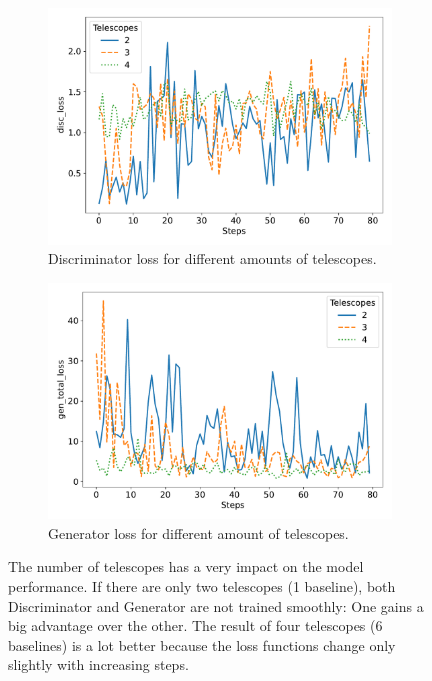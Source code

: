 \begin{figure}
	\centering
	\begin{subfigure}{0.5\linewidth}
		\centering
		\includegraphics[width=\textwidth]{fig/analysis/Plot_N_telescopes_disc_loss.pdf}
		\caption{Discriminator loss for different amounts of telescopes.}
		\label{fig:Plot_telescopes_discloss}
	\end{subfigure}\hfill
	\begin{subfigure}{0.5\linewidth}
		\centering
		\includegraphics[width=\textwidth]{fig/analysis/Plot_N_telescopes_gen_total_loss.pdf}
		\caption{Generator loss for different amount of telescopes.}
		\label{fig:Plot_telescopes_genloss}
	\end{subfigure}\hfill
	\caption{The number of telescopes has a very impact on the model performance. If there are only two telescopes (1 baseline), both Discriminator and Generator are not trained smoothly: One gains a big advantage over the other. The result of four telescopes (6 baselines) is a lot better because the loss functions change only slightly with increasing steps.}
	\label{fig:Plot_telescopes_loss}
\end{figure}
